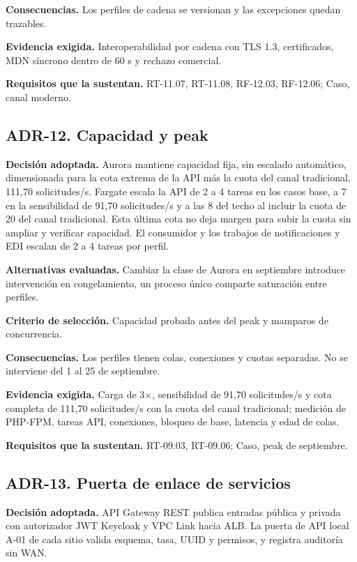 \textbf{Consecuencias.} Los perfiles de cadena se versionan y las excepciones quedan trazables.

\textbf{Evidencia exigida.} Interoperabilidad por cadena con TLS 1.3, certificados, MDN síncrono dentro de 60 s y rechazo comercial.

\textbf{Requisitos que la sustentan.} RT-11.07, RT-11.08, RF-12.03, RF-12.06; Caso, canal moderno.

\subsection*{ADR-12. Capacidad y peak}
\label{sub:adr-12}
\textbf{Decisión adoptada.} Aurora mantiene capacidad fija, sin escalado automático, dimensionada para la cota extrema de la API más la cuota del canal tradicional, 111,70 solicitudes/s. Fargate escala la API de 2 a 4 tareas en los casos base, a 7 en la sensibilidad de 91,70 solicitudes/s y a las 8 del techo al incluir la cuota de 20 del canal tradicional. Esta última cota no deja margen para subir la cuota sin ampliar y verificar capacidad. El consumidor y los trabajos de notificaciones y EDI escalan de 2 a 4 tareas por perfil.

\textbf{Alternativas evaluadas.} Cambiar la clase de Aurora en septiembre introduce intervención en congelamiento, un proceso único comparte saturación entre perfiles.

\textbf{Criterio de selección.} Capacidad probada antes del peak y mamparos de concurrencia.

\textbf{Consecuencias.} Los perfiles tienen colas, conexiones y cuotas separadas. No se interviene del 1 al 25 de septiembre.

\textbf{Evidencia exigida.} Carga de 3$\times$, sensibilidad de 91,70 solicitudes/s y cota completa de 111,70 solicitudes/s con la cuota del canal tradicional; medición de PHP-FPM, tareas API, conexiones, bloqueo de base, latencia y edad de colas.

\textbf{Requisitos que la sustentan.} RT-09.03, RT-09.06; Caso, peak de septiembre.

\subsection*{ADR-13. Puerta de enlace de servicios}
\label{sub:adr-13}
\textbf{Decisión adoptada.} API Gateway REST publica entradas pública y privada con autorizador JWT Keycloak y VPC Link hacia ALB. La puerta de API local A-01 de cada sitio valida esquema, tasa, UUID y permisos, y registra auditoría sin WAN.

